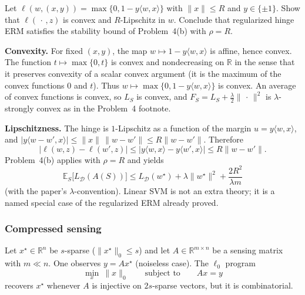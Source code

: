 \begin{exercise}
\label{ex:mlu-hinge-lip}
Let $\ell(w,(x,y))=\max\{0,1-y\langle w,x\rangle\}$ with $\lVert x\rVert\le R$ and $y\in\{\pm1\}$. Show that $\ell(\,\cdot\,,z)$ is convex and $R$-Lipschitz in $w$. Conclude that regularized hinge ERM satisfies the stability bound of Problem~4(b) with $\rho=R$.
\end{exercise}

\begin{solution}
\textbf{Convexity.}
For fixed $(x,y)$, the map $w\mapsto 1-y\langle w,x\rangle$ is affine, hence convex. The function $t\mapsto\max\{0,t\}$ is convex and nondecreasing on $\mathbb{R}$ in the sense that it preserves convexity of a scalar convex argument (it is the maximum of the convex functions $0$ and $t$). Thus $w\mapsto\max\{0,1-y\langle w,x\rangle\}$ is convex. An average of convex functions is convex, so $L_S$ is convex, and $F_S=L_S+\tfrac{\lambda}{2}\lVert\,\cdot\,\rVert^2$ is $\lambda$-strongly convex as in the Problem~4 footnote.

\textbf{Lipschitzness.}
The hinge is $1$-Lipschitz as a function of the margin $u=y\langle w,x\rangle$, and $\lvert y\langle w-w',x\rangle\rvert\le\lVert x\rVert\,\lVert w-w'\rVert\le R\lVert w-w'\rVert$. Therefore
\[
\bigl\lvert\ell(w,z)-\ell(w',z)\bigr\rvert
\le
\bigl\lvert y\langle w,x\rangle-y\langle w',x\rangle\bigr\rvert
\le
R\lVert w-w'\rVert.
\]
Problem~4(b) applies with $\rho=R$ and yields
\[
\mathbb{E}_S\bigl[L_{\mathcal{D}}(A(S))\bigr]
\le
L_{\mathcal{D}}(w^\star)+\lambda\lVert w^\star\rVert^2+\frac{2R^2}{\lambda m}
\]
(with the paper's $\lambda$-convention). Linear SVM is not an extra theory; it is a named special case of the regularized ERM already proved.
\end{solution}


\subsubsection{Compressed sensing}
\label{subsubsec:mlu-cs}

\begin{definition}
\label{def:mlu-cs}
Let $x^\star\in\mathbb{R}^n$ be $s$-sparse ($\lVert x^\star\rVert_0\le s$) and let $A\in\mathbb{R}^{m\times n}$ be a sensing matrix with $m\ll n$. One observes $y=Ax^\star$ (noiseless case). The $\ell_0$ program
\[
\min_x\ \lVert x\rVert_0
\qquad\text{subject to}\qquad
Ax=y
\]
recovers $x^\star$ whenever $A$ is injective on $2s$-sparse vectors, but it is combinatorial.
\end{definition}

